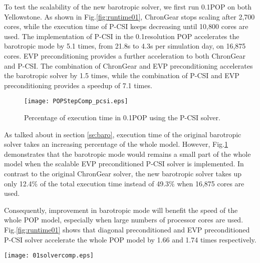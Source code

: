 To test the scalability of the new barotropic solver, we first run 0.1\degree POP on both Yellowstone.
As shown in Fig.\ref{fig:runtime01}, ChronGear stops scaling after 2,700 cores, while the execution time of P-CSI keeps decreasing until 10,800 cores are used. 
The implementation of P-CSI in the 0.1\degree resolution POP accelerates the barotropic mode by 5.1 times, from 21.8s to 4.3s per simulation day, on 16,875 cores.
EVP preconditioning provides a further acceleration to both ChronGear and P-CSI. 
The combination of ChronGear and EVP preconditioning accelerates the barotropic solver by 1.5 times,
while the combination of P-CSI and EVP preconditioning provides a speedup of 7.1 times.
\begin {figure}
\centering
\vspace{-10pt}
\texttt{[image: POPStepComp\_pcsi.eps]}
\caption[] {Percentage of execution time in 0.1\degree POP using the P-CSI solver.\label{fig:StepComp_pcsi}}
\vspace{-10pt}
\end{figure}

As talked about in section \ref{se:baro}, execution time of the original barotropic solver takes an increasing percentage of the whole model. 
However, Fig.\ref{fig:StepComp_pcsi} demonstrates that the barotropic mode would remains a small part of the whole model when the scalable EVP preconditioned P-CSI solver is implemented.  
In contrast to the original ChronGear solver, the new barotropic solver takes up only 12.4\% of the total execution time instead of 49.3\% when 16,875 cores are used. 

Consequently, improvement in barotropic mode will benefit the speed of the whole POP model, especially when large numbers of processor cores are used. 
Fig.\ref{fig:runtime01} shows that diagonal preconditioned and EVP preconditioned P-CSI solver accelerate the whole POP model by 1.66 and 1.74 times respectively. 


%
\begin{figure*}[!t]
\begin{center}
	\texttt{[image: 01solvercomp.eps]}
\end{center}
\caption[] {Time components of barotropic solvers in 0.1\degree POP. Four kinds of solvers are ChronGear or P-CSI with a diagonal preconditioner or an EVP preconditioner. (a) Execution time of global reduction, (b) Execution time of boundary communication, (c) Execution time of computing. }
\label{fig:component}
\end{figure*}


